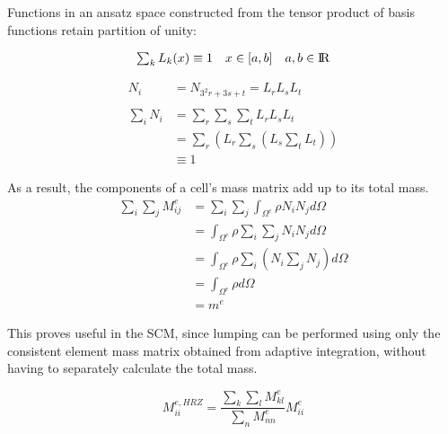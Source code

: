 Functions in an ansatz space constructed from the tensor product of basis functions
retain partition of unity:

\begin{equation*}
\begin{array}{rll}
	\sum_k L_k(x) \equiv 1 & x \in [a,b] & a,b \in \rm I\!R \\
\end{array}
\end{equation*}

\begin{equation}
\begin{array}{rl}
	N_i &= N_{3^2r + 3s + t} = L_r L_s L_t \\
	\\
	\sum_i N_i
	&= \sum_r \sum_s \sum_t L_r L_s L_t	\\
	&= \sum_r
	\left(
		L_r \sum_s
		\left(
			L_s \sum_t L_t
		\right)
	\right) \\
	& \equiv 1
\end{array}
\end{equation}


As a result, the components of a cell's mass matrix add up to its total mass.
\begin{equation}
\begin{aligned}
	\sum_i \sum_j M_{ij}^e &= \sum_i \sum_j \int_{\Omega^e} \rho N_i N_j d\Omega \\
	&= \int_{\Omega^e} \rho \sum_i \sum_j N_i N_j d\Omega \\
	&= \int_{\Omega^e} \rho \sum_i
	\left(
		N_i \sum_j N_j
	\right)
	d\Omega \\
	&= \int_{\Omega^e} \rho d\Omega \\
	&= m^e
\end{aligned}
\end{equation}

This proves useful in the SCM, since lumping can be performed using only the consistent
element mass matrix obtained from adaptive integration, without having to separately
calculate the total mass.

\begin{equation}
	M_{ii}^{e,HRZ} =
	\frac{\sum_k \sum_l M_{kl}^e}{\sum_n M_{nn}^e} M_{ii}^e
\end{equation}